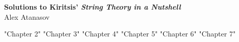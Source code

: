 \documentclass[11pt]{article}
\begin{document}
	\begin{center}
		\Large \textbf{Solutions to Kiritsis' \emph{String Theory in a Nutshell}}\\
		Alex Atanasov
	\end{center}
	
	{"Chapter 2"}
	\newpage 
	{"Chapter 3"}
	\newpage 
	{"Chapter 4"}
	\newpage 
	{"Chapter 5"}
	\newpage 
	{"Chapter 6"}
	\newpage 
	{"Chapter 7"}
\end{document}
